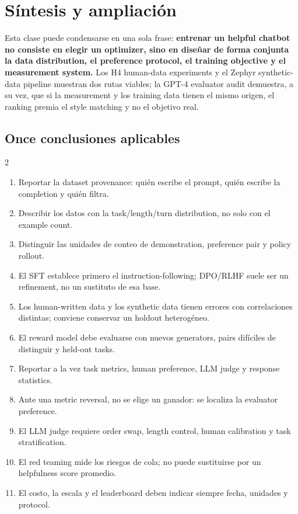 \section{Síntesis y ampliación}

Esta clase puede condensarse en una sola frase: \textbf{entrenar un helpful chatbot no consiste en elegir un optimizer, sino en diseñar de forma conjunta la data distribution, el preference protocol, el training objective y el measurement system.} Los H4 human-data experiments y el Zephyr synthetic-data pipeline muestran dos rutas viables; la GPT-4 evaluator audit demuestra, a su vez, que si la measurement y los training data tienen el mismo origen, el ranking premia el style matching y no el objetivo real.

\subsection{Once conclusiones aplicables}

\begingroup
\footnotesize
\setlength{\columnsep}{1.2em}
\begin{multicols}{2}
\begin{enumerate}[itemsep=0.05em,topsep=0.1em,parsep=0pt,leftmargin=*]
  \item Reportar la dataset provenance: quién escribe el prompt, quién escribe la completion y quién filtra.
  \item Describir los datos con la task/length/turn distribution, no solo con el example count.
  \item Distinguir las unidades de conteo de demonstration, preference pair y policy rollout.
  \item El SFT establece primero el instruction-following; DPO/RLHF suele ser un refinement, no un sustituto de esa base.
  \item Los human-written data y los synthetic data tienen errores con correlaciones distintas; conviene conservar un holdout heterogéneo.
  \item El reward model debe evaluarse con nuevos generators, pairs difíciles de distinguir y held-out tasks.
  \item Reportar a la vez task metrics, human preference, LLM judge y response statistics.
  \item Ante una metric reversal, no se elige un ganador: se localiza la evaluator preference.
  \item El LLM judge requiere order swap, length control, human calibration y task stratification.
  \item El red teaming mide los riesgos de cola; no puede sustituirse por un helpfulness score promedio.
  \item El costo, la escala y el leaderboard deben indicar siempre fecha, unidades y protocol.
\end{enumerate}
\end{multicols}
\endgroup

